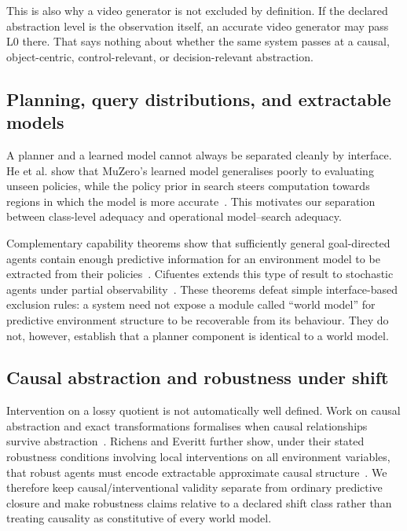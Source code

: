 \documentclass[10pt]{article}
\begin{document}
This is also why a video generator is not excluded by definition. If the declared abstraction level is the observation itself, an accurate video generator may pass L0 there. That says nothing about whether the same system passes at a causal, object-centric, control-relevant, or decision-relevant abstraction.

\subsection{Planning, query distributions, and extractable models}

A planner and a learned model cannot always be separated cleanly by interface. He et al. show that MuZero's learned model generalises poorly to evaluating unseen policies, while the policy prior in search steers computation towards regions in which the model is more accurate~\cite{he2024}. This motivates our separation between class-level adequacy and operational model--search adequacy.

Complementary capability theorems show that sufficiently general goal-directed agents contain enough predictive information for an environment model to be extracted from their policies~\cite{richens2025}. Cifuentes extends this type of result to stochastic agents under partial observability~\cite{cifuentes2026}. These theorems defeat simple interface-based exclusion rules: a system need not expose a module called ``world model'' for predictive environment structure to be recoverable from its behaviour. They do not, however, establish that a planner component is identical to a world model.

\subsection{Causal abstraction and robustness under shift}

Intervention on a lossy quotient is not automatically well defined. Work on causal abstraction and exact transformations formalises when causal relationships survive abstraction~\cite{rubenstein2017,beckers2019}. Richens and Everitt further show, under their stated robustness conditions involving local interventions on all environment variables, that robust agents must encode extractable approximate causal structure~\cite{richens2024}. We therefore keep causal/interventional validity separate from ordinary predictive closure and make robustness claims relative to a declared shift class rather than treating causality as constitutive of every world model.
\end{document}
